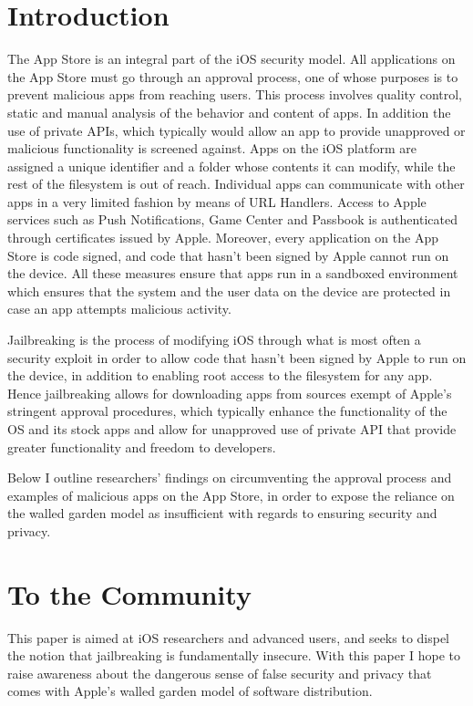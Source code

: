 \documentclass[12pt, titlepage, oneside]{article}
\newcommand{\tab}{\hspace*{2em}}
\begin{document}
\section{Introduction}
\tab The App Store is an integral part of the iOS security model. All applications on the App Store must go through an approval process, one of whose purposes is to prevent malicious apps from reaching users. This process involves quality control, static and manual analysis of the behavior and content of apps. In addition the use of private APIs, which typically would allow an app to provide unapproved or malicious functionality is screened against. Apps on the iOS platform are assigned a unique identifier and a folder whose contents it can modify, while the rest of the filesystem is out of reach. Individual apps can communicate with other apps in a very limited fashion by means of URL Handlers. Access to Apple services such as Push Notifications, Game Center and Passbook is authenticated through certificates issued by Apple. Moreover, every application on the App Store is code signed, and code that hasn't been signed by Apple cannot run on the device. All these measures ensure that apps run in a sandboxed environment which ensures that the system and the user data on the device are protected in case an app attempts malicious activity.

Jailbreaking is the process of modifying iOS through what is most often a security exploit in order to allow code that hasn't been signed by Apple to run on the device, in addition to enabling root access to the filesystem for any app. Hence jailbreaking allows for downloading apps from sources exempt of Apple's stringent approval procedures, which typically enhance the functionality of the OS and its stock apps and allow for unapproved use of private API that provide greater functionality and freedom to developers. 



 Below I outline researchers' findings on circumventing the approval process and examples of malicious apps on the App Store, in order to expose the reliance on the walled garden model as insufficient with regards to ensuring security and privacy. 

\section{To the Community}
This paper is aimed at iOS researchers and advanced users, and seeks to dispel the notion that jailbreaking is fundamentally insecure. With this paper I hope to raise awareness about the dangerous sense of false security and privacy that comes with Apple's walled garden model of software distribution. 
\end{document}
